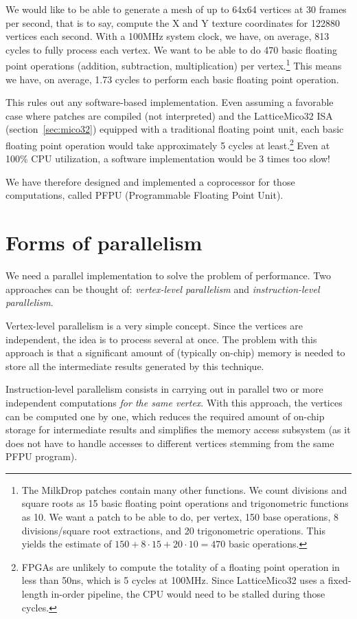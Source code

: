 \documentclass[a4paper,11pt]{kthesis}
\begin{document}
We would like to be able to generate a mesh of up to 64x64 vertices at 30 frames per second, that is to say, compute the X and Y texture coordinates for 122880 vertices each second. With a 100MHz system clock, we have, on average, 813 cycles to fully process each vertex. We want to be able to do 470 basic floating point operations (addition, subtraction, multiplication) per vertex.\footnote{The MilkDrop patches contain many other functions. We count divisions and square roots as 15 basic floating point operations and trigonometric functions as 10. We want a patch to be able to do, per vertex, 150 base operations, 8 divisions/square root extractions, and 20 trigonometric operations. This yields the estimate of $150+8\cdot15+20\cdot10=470$ basic operations.} This means we have, on average, 1.73 cycles to perform each basic floating point operation.

This rules out any software-based implementation. Even assuming a favorable case where patches are compiled (not interpreted) and the LatticeMico32 ISA (section~\ref{sec:mico32}) equipped with a traditional floating point unit, each basic floating point operation would take approximately 5 cycles at least.\footnote{FPGAs are unlikely to compute the totality of a floating point operation in less than 50ns, which is 5 cycles at 100MHz. Since LatticeMico32 uses a fixed-length in-order pipeline, the CPU would need to be stalled during those cycles.} Even at 100\% CPU utilization, a software implementation would be 3 times too slow!

We have therefore designed and implemented a coprocessor for those computations, called PFPU (Programmable Floating Point Unit).

\section{Forms of parallelism}
We need a parallel implementation to solve the problem of performance. Two approaches can be thought of: \textit{vertex-level parallelism} and \textit{instruction-level parallelism}.

Vertex-level parallelism is a very simple concept. Since the vertices are independent, the idea is to process several at once. The problem with this approach is that a significant amount of (typically on-chip) memory is needed to store all the intermediate results generated by this technique.

Instruction-level parallelism consists in carrying out in parallel two or more independent computations \textit{for the same vertex}. With this approach, the vertices can be computed one by one, which reduces the required amount of on-chip storage for intermediate results and simplifies the memory access subsystem (as it does not have to handle accesses to different vertices stemming from the same PFPU program).
\end{document}

